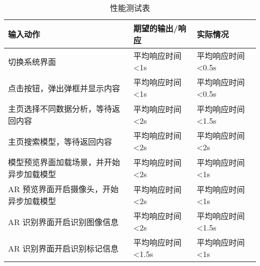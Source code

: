 \begin{table}[H]
  \centering
  \small
  \renewcommand\arraystretch{1.1}
  \caption{性能测试表}
  \label{table:性能测试表}
  \setlength{\tabcolsep}{4mm}
  \begin{tabular}{|p{4.5cm}|p{4cm}|p{4cm}|}
    \hline \textbf{输入动作} & \textbf{期望的输出/响应} & \textbf{实际情况} \\
    \hline 切换系统界面 & 平均响应时间 <1s & 平均响应时间 <0.5s  \\
    \hline 点击按钮，弹出弹框并显示内容 & 平均响应时间 <1s & 平均响应时间 <0.5s  \\
    \hline 主页选择不同数据分析，等待返回内容 & 平均响应时间 <2s & 平均响应时间 <1.5s  \\
    \hline 主页搜索模型，等待返回内容 & 平均响应时间 <2s & 平均响应时间 <2s  \\
    \hline 模型预览界面加载场景，并开始异步加载模型 & 平均响应时间 <2s & 平均响应时间 <1s  \\
    \hline AR 预览界面开启摄像头，开始异步加载模型 & 平均响应时间 <2s & 平均响应时间 <1s  \\
    \hline AR 识别界面开启识别图像信息 & 平均响应时间 <2s & 平均响应时间 <1.5s  \\
    \hline AR 识别界面开启识别标记信息 & 平均响应时间 <1.5s & 平均响应时间 <1s  \\
    \hline
  \end{tabular}
\end{table}